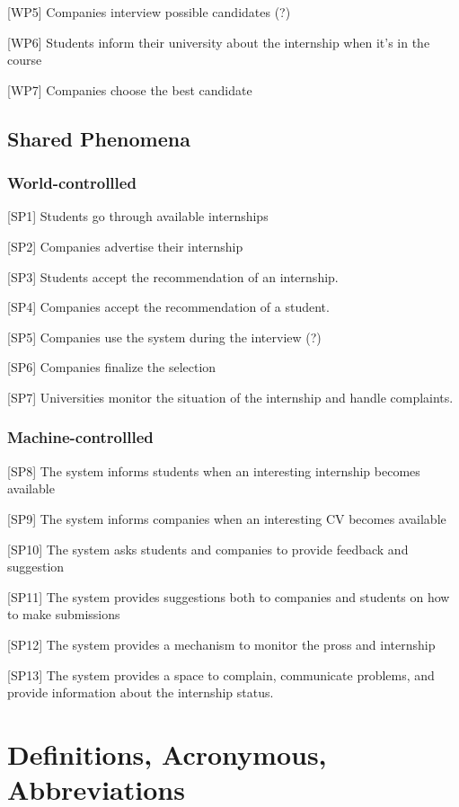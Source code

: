 [WP5] Companies interview possible candidates (?)

[WP6] Students inform their university about the internship when it's in the course

[WP7] Companies choose the best candidate

\subsection{Shared Phenomena}

\subsubsection{World-controllled}
[SP1] Students go through available internships

[SP2] Companies advertise their internship

[SP3] Students accept the recommendation of an internship.

[SP4] Companies accept the recommendation of a student. 

[SP5] Companies use the system during the interview (?)

[SP6] Companies finalize the selection

[SP7] Universities monitor the situation of the internship and handle complaints.


\subsubsection{Machine-controllled}
[SP8] The system informs students when an interesting internship becomes available

[SP9] The system informs companies when an interesting CV becomes available

[SP10] The system asks students and companies to provide feedback and suggestion

[SP11] The system provides suggestions both to companies and students on how to make submissions

[SP12] The system provides a mechanism to monitor the pross and internship

[SP13] The system provides a space to complain, communicate problems, and provide information about the internship status.

\section{Definitions, Acronymous, Abbreviations}
